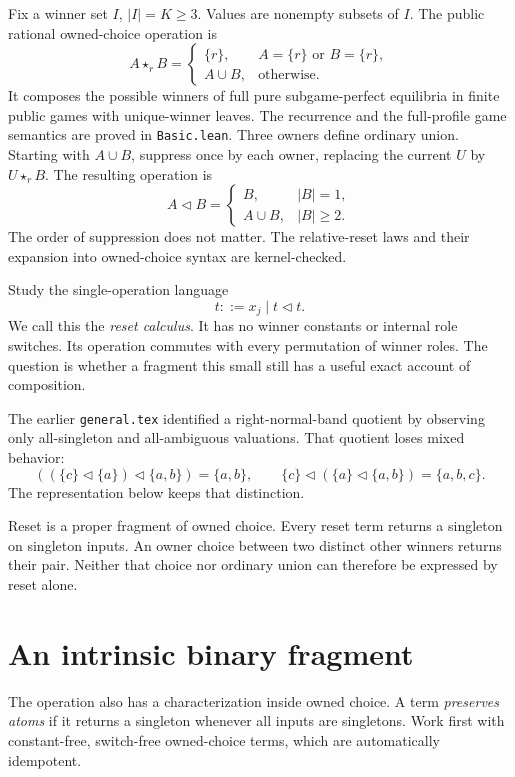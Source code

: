 \documentclass[11pt]{article}
\newcommand{\del}{\mathbin{\triangleleft}}
\begin{document}
Fix a winner set $I$, $|I|=K\geq3$. Values are nonempty subsets of $I$.
The public rational owned-choice operation is
\[
 A\star_r B=
 \begin{cases}\{r\},&A=\{r\}\text{ or }B=\{r\},\\
 A\cup B,&\text{otherwise}.
 \end{cases}
\]
It composes the possible winners of full pure subgame-perfect
equilibria in finite public games with unique-winner leaves. The
recurrence and the full-profile game semantics are proved in
\texttt{Basic.lean}. Three owners define ordinary union. Starting with
$A\cup B$, suppress once by each owner, replacing the current $U$ by
$U\star_r B$. The resulting operation is
\begin{equation}\label{eq:reset}
 A\del B=
 \begin{cases}
 B,&|B|=1,\\
 A\cup B,&|B|\geq2.
 \end{cases}
\end{equation}
The order of suppression does not matter. The relative-reset laws and
their expansion into owned-choice syntax are kernel-checked.

Study the single-operation language
\[
 t::=x_j\mid t\del t.
\]
We call this the \emph{reset calculus}. It has no winner constants or
internal role switches. Its operation commutes with every permutation
of winner roles. The question is whether a fragment this small still
has a useful exact account of composition.

The earlier \texttt{general.tex} identified a right-normal-band quotient
by observing only all-singleton and all-ambiguous valuations. That
quotient loses mixed behavior:
\[
 ((\{c\}\del\{a\})\del\{a,b\})=\{a,b\},\qquad
 \{c\}\del(\{a\}\del\{a,b\})=\{a,b,c\}.
\]
The representation below keeps that distinction.

Reset is a proper fragment of owned choice. Every reset term returns a
singleton on singleton inputs. An owner choice between two distinct
other winners returns their pair. Neither that choice nor ordinary
union can therefore be expressed by reset alone.

\section{An intrinsic binary fragment}

The operation also has a characterization inside owned choice.
A term \emph{preserves atoms} if it returns a singleton whenever all
inputs are singletons. Work first with constant-free, switch-free
owned-choice terms, which are automatically idempotent.
\end{document}
